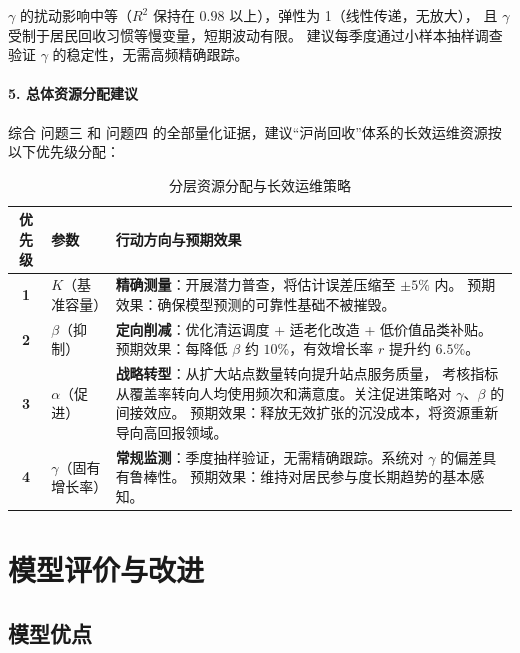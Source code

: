 \documentclass[12pt,a4paper]{ctexart}
\begin{document}
$\gamma$ 的扰动影响中等（$R^2$ 保持在 $0.98$ 以上），弹性为 1（线性传递，无放大），
且 $\gamma$ 受制于居民回收习惯等慢变量，短期波动有限。
建议每季度通过小样本抽样调查验证 $\gamma$ 的稳定性，无需高频精确跟踪。

\paragraph*{5. 总体资源分配建议}

综合 问题三 和 问题四 的全部量化证据，建议``沪尚回收''体系的长效运维资源按以下优先级分配：

\begin{table}[htbp]
\centering
\caption{分层资源分配与长效运维策略}
\label{tab:resource_allocation}
\begin{tabular}{clp{7cm}}
\toprule
优先级 & 参数 & 行动方向与预期效果 \\
\midrule
\textbf{1} & $K$（基准容量） &
  \textbf{精确测量}：开展潜力普查，将估计误差压缩至 $\pm 5\%$ 内。
  预期效果：确保模型预测的可靠性基础不被摧毁。 \\

\textbf{2} & $\beta$（抑制） &
  \textbf{定向削减}：优化清运调度 + 适老化改造 + 低价值品类补贴。
  预期效果：每降低 $\beta$ 约 $10\%$，有效增长率 $r$ 提升约 $6.5\%$。 \\

\textbf{3} & $\alpha$（促进） &
  \textbf{战略转型}：从扩大站点数量转向提升站点服务质量，
  考核指标从覆盖率转向人均使用频次和满意度。关注促进策略对 $\gamma$、$\beta$ 的间接效应。
  预期效果：释放无效扩张的沉没成本，将资源重新导向高回报领域。 \\

\textbf{4} & $\gamma$（固有增长率） &
  \textbf{常规监测}：季度抽样验证，无需精确跟踪。系统对 $\gamma$ 的偏差具有鲁棒性。
  预期效果：维持对居民参与度长期趋势的基本感知。 \\
\bottomrule
\end{tabular}
\end{table}

\section{模型评价与改进}

\subsection{模型优点}
\end{document}
